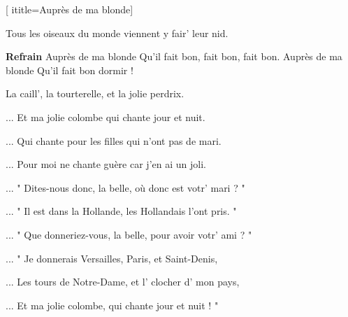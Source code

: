 [
ititle={Auprès de ma blonde}]


\beginverse
{}
Tous les oiseaux du monde viennent y fair' leur nid.
\endverse

\beginchorus
\textbf{Refrain}
Auprès de ma blonde
Qu'il fait bon, fait bon, fait bon.
Auprès de ma blonde
Qu'il fait bon dormir !
\endchorus

\beginverse
{}
La caill', la tourterelle, et la jolie perdrix.
\endverse

\beginverse
... Et ma jolie colombe qui chante jour et nuit.
\endverse

\beginverse
... Qui chante pour les filles qui n'ont pas de mari.
\endverse

\beginverse
... Pour moi ne chante guère car j'en ai un joli.
\endverse

\beginverse
... " Dites-nous donc, la belle, où donc est votr' mari ? "
\endverse

\beginverse
... " Il est dans la Hollande, les Hollandais l'ont pris. "
\endverse

\beginverse
... " Que donneriez-vous, la belle, pour avoir votr' ami ? "
\endverse

\beginverse
... " Je donnerais Versailles, Paris, et Saint-Denis,
\endverse

\beginverse
... Les tours de Notre-Dame, et l' clocher d' mon pays,
\endverse

\beginverse
... Et ma jolie colombe, qui chante jour et nuit ! "
\endverse

\endsong